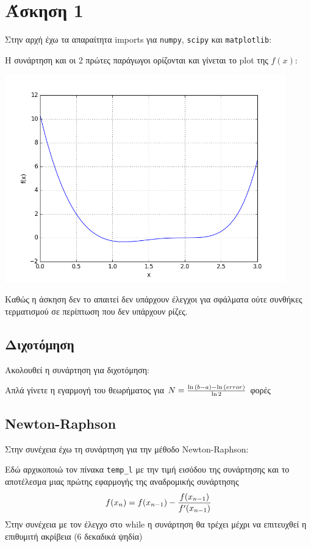 \section{Άσκηση 1}

Στην αρχή έχω τα απαραίτητα imports για \texttt{numpy}, \texttt{scipy} και
\texttt{matplotlib}:



Η συνάρτηση και οι 2 πρώτες παράγωγοι
ορίζονται και γίνεται το plot της $f(x)$:


\begin{center}
\includegraphics[width=\linewidth, height=9cm]{ex1/plot.png}
\end{center}

Καθώς η άσκηση δεν το απαιτεί δεν υπάρχουν έλεγχοι για σφάλματα
ούτε συνθήκες τερματισμού σε περίπτωση που δεν υπάρχουν ρίζες.
\subsection{Διχοτόμηση}
Ακολουθεί η συνάρτηση για διχοτόμηση:


Απλά γίνετε η εγαρμογή του θεωρήματος για
$N = {{\ln{(b-a)} - \ln{(error)}}\over{\ln{2}}}$ φορές
\newpage
\subsection{Newton-Raphson}
Στην συνέχεια έχω τη συνάρτηση για την μέθοδο Newton-Raphson:


Εδώ αρχικοποιώ τον πίνακα \texttt{temp\_l} με την τιμή
εισόδου της συνάρτησης και το αποτέλεσμα μιας πρώτης εφαρμογής της
αναδρομικής συνάρτησης $$f(x_{n}) = f(x_{n-1}) - {{f(x_{n-1})} \over {f'(x_{n-1})}}$$
Στην συνέχεια με τον έλεγχο στο while η συνάρτηση θα τρέχει μέχρι να
επιτευχθεί η επιθυμιτή ακρίβεια (6 δεκαδικά ψηδία)

